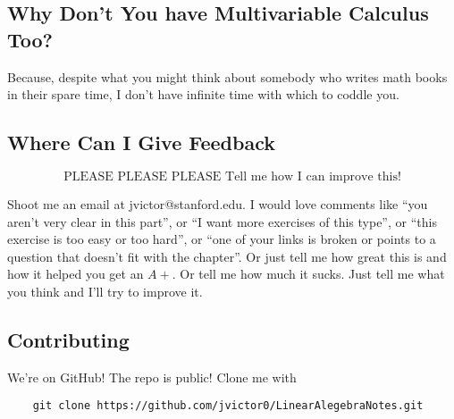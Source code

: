 \subsection*{Why Don't You have Multivariable Calculus Too?}

Because, despite what you might think about somebody who writes math books in their spare time, I don't have infinite time with which to coddle you.

\subsection*{Where Can I Give Feedback}

\[\mbox{PLEASE PLEASE PLEASE Tell me how I can improve this!}\]

Shoot me an email at jvictor@stanford.edu.  
I would love comments like ``you aren't very clear in this part'', or ``I want more exercises of this type'', or ``this exercise is too easy or too hard'', 
or ``one of your links is broken or points to a question that doesn't fit with the chapter''.
Or just tell me how great this is and how it helped you get an $A+$.  
Or tell me how much it sucks.  
Just tell me what you think and I'll try to improve it.


\subsection*{Contributing}

We're on GitHub!
The repo is public!  
Clone me with
\begin{verbatim}
    git clone https://github.com/jvictor0/LinearAlegebraNotes.git
\end{verbatim}

